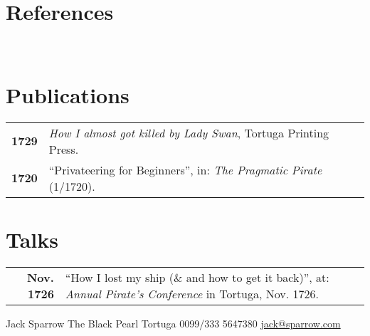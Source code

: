 \documentclass[grey]{hipstercv}
\newlength{\rightcolwidth}
\begin{document}
\begin{paracol}{2}
\begin{minipage}[t]{0.3\textwidth}
\section*{References}
 \\

\end{minipage}\hfill
\begin{minipage}[t]{0.3\textwidth}
\section*{Publications}
\begin{tabular}{>{\footnotesize\bfseries}r >{\footnotesize}p{}}
    1729 & \emph{How I almost got killed by Lady Swan}, Tortuga Printing Press. \\
    1720 & ``Privateering for Beginners'', in: \emph{The Pragmatic Pirate} (1/1720).
\end{tabular}
\section*{Talks}
\begin{tabular}{>{\footnotesize\bfseries}r >{\footnotesize}p{}}
    Nov. 1726 & ``How I lost my ship (\& and how to get it back)'', at: \emph{Annual Pirate's Conference} in Tortuga, Nov. 1726.
\end{tabular}
\end{minipage}









\vfill{} %

\setlength{\parindent}{0pt}
\begin{minipage}[t]{\rightcolwidth}
\begin{center}\fontfamily{\sfdefault}\selectfont \color{black!70}
{\small Jack Sparrow  The Black Pearl  Tortuga  0099/333 5647380 \newline{} \protect\url{jack@sparrow.com}
}
\end{center}
\end{minipage}


\end{paracol}
\end{document}
